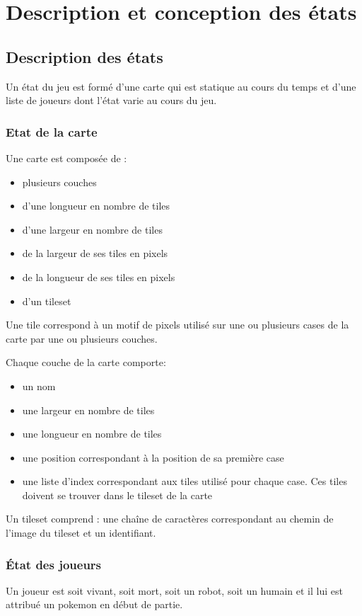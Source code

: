 \documentclass[a4paper,12pt]{article}
\begin{document}
    \clearpage
    \section{Description et conception des états}

    \subsection{Description des états}
    Un état du jeu est formé d'une carte qui est statique au cours du temps et d'une liste de joueurs dont l'état varie au cours du jeu.

    \subsubsection{Etat de la carte}
    Une carte est composée de : \begin{itemize}
        \item plusieurs couches
        \item d'une longueur en nombre de tiles
        \item d'une largeur en nombre de tiles
        \item de la largeur de ses tiles en pixels
        \item de la longueur de ses tiles en pixels
        \item d'un tileset
    \end{itemize}
    Une tile correspond à un motif de pixels utilisé sur une ou plusieurs cases de la carte par une ou plusieurs couches.

    Chaque couche de la carte comporte:\begin{itemize}
        \item un nom
        \item une largeur en nombre de tiles
        \item une longueur en nombre de tiles
        \item une position correspondant à la position de sa première case
        \item une liste d'index correspondant aux tiles utilisé pour chaque case. Ces tiles doivent se trouver dans le tileset de la carte
    \end{itemize}

    Un tileset comprend :  une chaîne de caractères correspondant au chemin de l'image du tileset et un identifiant.

    \subsubsection{État des joueurs}
    Un joueur est soit vivant, soit mort, soit un robot, soit un humain et il lui est attribué un pokemon en début de partie.
\end{document}
